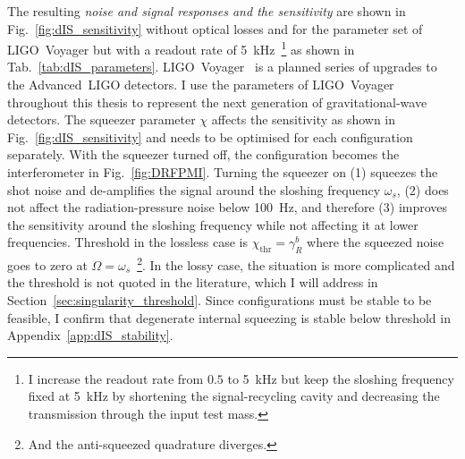 The resulting \emph{noise and signal responses and the sensitivity} are shown in Fig.~\ref{fig:dIS_sensitivity} without optical losses and for the parameter set of LIGO~Voyager but with a readout rate of 5~kHz~\footnote{I increase the readout rate from $0.5$ to 5~kHz but keep the sloshing frequency fixed at 5~kHz by shortening the signal-recycling cavity and decreasing the transmission through the input test mass.} as shown in Tab.~\ref{tab:dIS_parameters}.
LIGO~Voyager~\cite{LIGO_Voyager} is a planned series of upgrades to the Advanced~LIGO detectors. I use the parameters of LIGO~Voyager throughout this thesis to represent the next generation of gravitational-wave detectors. %
The squeezer parameter $\chi$ affects the sensitivity as shown in Fig.~\ref{fig:dIS_sensitivity} and needs to be optimised for each configuration separately. With the squeezer turned off, the configuration becomes the interferometer in Fig.~\ref{fig:DRFPMI}. %
Turning the squeezer on (1) squeezes the shot noise and de-amplifies the signal around the sloshing frequency $\omega_s$, (2) does not affect the radiation-pressure noise below 100~Hz, and therefore (3) improves the sensitivity around the sloshing frequency while not affecting it at lower frequencies. 
Threshold in the lossless case is $\chi_\text{thr}=\gamma^b_R$ where the squeezed noise goes to zero at $\Omega=\omega_s$~\footnote{And the anti-squeezed quadrature diverges.}. In the lossy case, the situation is more complicated and the threshold is not quoted in the literature, which I will address in Section~\ref{sec:singularity_threshold}. Since configurations must be stable to be feasible, I confirm that degenerate internal squeezing is stable below threshold in Appendix~\ref{app:dIS_stability}.
